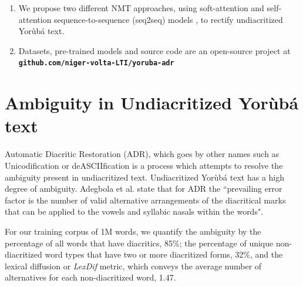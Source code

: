 \documentclass[a0,landscape]{a0poster}
\begin{document}
\begin{multicols}{4}
\begin{enumerate}
\item We propose two different NMT approaches, using soft-attention and self-attention sequence-to-sequence (seq2seq) models \cite{bahdanau2014neural, vaswani2017attention}, to rectify undiacritized Yor{\`u}b{\'a} text.
\item Datasets, pre-trained models and source code are an open-source project at \textbf{\texttt{github.com/niger-volta-LTI/yoruba-adr}}
\end{enumerate}

\color{DarkSlateGray} %


\section*{Ambiguity in Undiacritized Yor{\`u}b{\'a} text }

Automatic Diacritic Restoration (ADR), which goes by other names such as Unicodification or deASCIIfication is a process which attempts to resolve the ambiguity present in undiacritized text. Undiacritized Yor{\`u}b{\'a} text has a high degree of ambiguity. Adegbola et al. state that for ADR the ``prevailing error factor is the number of valid alternative arrangements of the diacritical marks that can be applied to the vowels and syllabic nasals within the words".

For our training corpus of 1M words, we quantify the ambiguity by the percentage of all words that have diacritics, 85\%; the percentage of unique non-diacritized word types that have two or more diacritized forms, 32\%, and the lexical diffusion or \emph{LexDif} metric, which conveys the average number of alternatives for each non-diacritized word, 1.47. 


\end{multicols}
\end{document}
